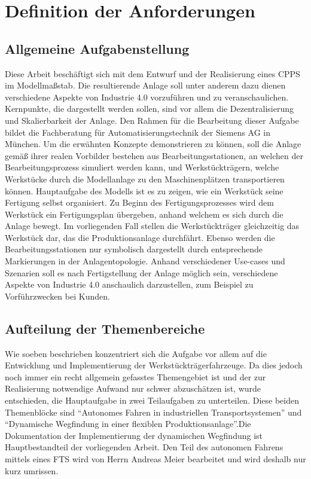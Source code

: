 \chapter{Definition der Anforderungen}

\section{Allgemeine Aufgabenstellung}

	Diese Arbeit beschäftigt sich mit dem Entwurf und der Realisierung eines \ac{CPPS} im Modellmaßstab. Die resultierende Anlage soll unter anderem dazu dienen verschiedene Aspekte von Industrie 4.0 vorzuführen und zu veranschaulichen. Kernpunkte, die dargestellt werden sollen, sind vor allem die Dezentralisierung und Skalierbarkeit der Anlage. Den Rahmen für die Bearbeitung dieser Aufgabe bildet die Fachberatung für Automatisierungstechnik der Siemens AG in München. Um die erwähnten Konzepte demonstrieren zu können, soll die Anlage gemäß ihrer realen Vorbilder bestehen aus Bearbeitungsstationen, an welchen der Bearbeitungsprozess simuliert werden kann, und Werkstückträgern, welche Werkstücke durch die Modellanlage zu den Maschinenplätzen transportieren können. Hauptaufgabe des Modells ist es zu zeigen, wie ein Werkstück seine Fertigung selbst organisiert. Zu Beginn des Fertigungsprozesses wird dem Werkstück ein Fertigungsplan übergeben, anhand welchem es sich durch die Anlage bewegt. Im vorliegenden Fall stellen die Werkstückträger gleichzeitig das Werkstück dar, das die Produktionsanlage durchfährt. Ebenso werden die Bearbeitungsstationen nur symbolisch dargestellt durch entsprechende Markierungen in der Anlagentopologie. Anhand verschiedener Use-cases und Szenarien soll es nach Fertigstellung der Anlage möglich sein, verschiedene Aspekte von Industrie 4.0 anschaulich darzustellen, zum Beispiel zu Vorführzwecken bei Kunden.

\section{Aufteilung der Themenbereiche}

	Wie soeben beschrieben konzentriert sich die Aufgabe vor allem auf die Entwicklung und Implementierung der Werkstückträgerfahrzeuge. Da dies jedoch noch immer ein recht allgemein gefasstes Themengebiet ist und der zur Realisierung notwendige Aufwand nur schwer abzuschätzen ist, wurde entschieden, die Hauptaufgabe in zwei Teilaufgaben zu unterteilen. Diese beiden Themenblöcke sind "`Autonomes Fahren in industriellen Transportsystemen"' und "`Dynamische Wegfindung in einer flexiblen Produktionsanlage"'\cite{I40Modell}.Die Dokumentation der Implementierung der dynamischen Wegfindung ist Hauptbestandteil der vorliegenden Arbeit. Den Teil des autonomen Fahrens mittels eines \ac{FTS} wird von Herrn Andreas Meier bearbeitet und wird deshalb nur kurz umrissen.

